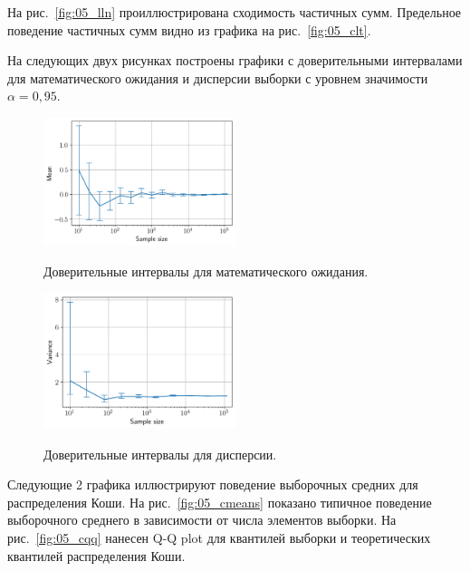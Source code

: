 \documentclass[12pt, a4paper]{article} %
\begin{document}
На рис.~\ref{fig:05_lln} проиллюстрирована сходимость частичных сумм.
Предельное поведение частичных сумм видно из графика на рис.~\ref{fig:05_clt}.

На следующих двух рисунках построены графики с доверительными интервалами для математического ожидания и дисперсии выборки с уровнем значимости $\alpha = 0{,}95$.

\begin{figure}[H]
\begin{multicols}{2}
        \centering
        \includegraphics[width=0.5\textwidth]{figures/05_mean.png}
        \caption{Доверительные интервалы для математического ожидания.}
        \label{fig:05_mean}
    \hfill 
        \centering
        \includegraphics[width=0.5\textwidth]{figures/05_var.png}
        \caption{Доверительные интервалы для дисперсии.}
        \label{fig:05_var}
\end{multicols}
\end{figure}

Следующие 2 графика иллюстрируют поведение выборочных средних для распределения Коши.
На рис.~\ref{fig:05_cmeans} показано типичное поведение выборочного среднего в зависимости от числа элементов выборки.
На рис.~\ref{fig:05_cqq} нанесен Q-Q plot для квантилей выборки и теоретических квантилей распределения Коши.
\end{document}
